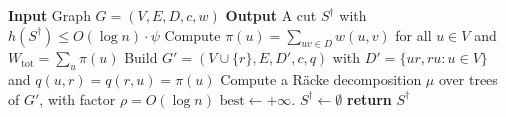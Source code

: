 \begin{algorithm}[tbp]
\caption{$O(\log n)$-approximation for minimum one-sided quasi-expansion}
\textbf{Input} Graph $G=(V,E,D,c,w)$\;
\textbf{Output} A cut $S^{\dagger}$ with $h(S^{\dagger})\le O(\log n)\cdot\psi$\;
Compute $\pi(u)=\sum_{uv\in D}w(u,v)$ for all $u\in V$ and $W_{\mathrm{tot}}=\sum_u\pi(u)$\;
Build $G'=(V\cup\{r\},E,D',c,q)$ with $D'=\{ur,ru:u\in V\}$ and $q(u,r)=q(r,u)=\pi(u)$\;
Compute a R\"acke decomposition $\mu$ over trees of $G'$, with factor $\rho=O(\log n)$\;
$\mathrm{best}\gets+\infty$. $S^{\dagger}\gets\emptyset$\;
\textbf{return} $S^{\dagger}$\;
\end{algorithm}

